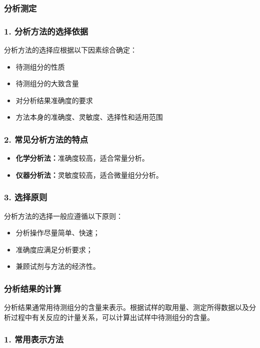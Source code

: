 \documentclass[12pt,a4paper]{article}
\numberwithin{equation}{section}
\begin{document}
\subsubsection{分析测定}
\subsubsection*{1. 分析方法的选择依据}

分析方法的选择应根据以下因素综合确定：
\begin{itemize}
    \item 待测组分的性质
    \item 待测组分的大致含量
    \item 对分析结果准确度的要求
    \item 方法本身的准确度、灵敏度、选择性和适用范围
\end{itemize}

\subsubsection*{2. 常见分析方法的特点}

\begin{itemize}
    \item \textbf{化学分析法：}准确度较高，适合常量分析。
    \item \textbf{仪器分析法：}灵敏度较高，适合微量组分分析。
\end{itemize}

\subsubsection*{3. 选择原则}

分析方法的选择一般应遵循以下原则：
\begin{itemize}
    \item 分析操作尽量简单、快速；
    \item 准确度应满足分析要求；
    \item 兼顾试剂与方法的经济性。
\end{itemize}
\subsubsection{分析结果的计算}
分析结果通常用待测组分的含量来表示。根据试样的取用量、测定所得数据以及分析过程中有关反应的计量关系，可以计算出试样中待测组分的含量。

\subsubsection*{1. 常用表示方法}
\end{document}
